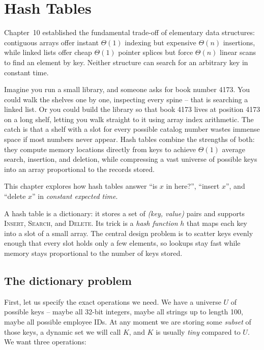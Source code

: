\chapter{Hash Tables}

Chapter~10 established the fundamental trade-off of elementary data structures:
contiguous arrays offer instant $\Theta(1)$ indexing but expensive $\Theta(n)$
insertions, while linked lists offer cheap $\Theta(1)$ pointer splices but force
$\Theta(n)$ linear scans to find an element by key. Neither structure can search
for an arbitrary key in constant time.

Imagine you run a small library, and someone asks for book number 4173. You could
walk the shelves one by one, inspecting every spine -- that is searching a linked
list. Or you could build the library so that book 4173 lives at position 4173 on a
long shelf, letting you walk straight to it using array index arithmetic. The
catch is that a shelf with a slot for every possible catalog number wastes immense
space if most numbers never appear. Hash tables combine the strengths of both:
they compute memory locations directly from keys to achieve $\Theta(1)$ average
search, insertion, and deletion, while compressing a vast universe of possible keys
into an array proportional to the records stored.

This chapter explores how hash tables answer ``is $x$ in here?'', ``insert $x$'', and ``delete $x$'' in \emph{constant expected time}.

\begin{focusbox}
A hash table is a dictionary: it stores a set of \emph{(key, value)} pairs and supports \textsc{Insert}, \textsc{Search}, and \textsc{Delete}. Its trick is a \emph{hash function} $h$ that maps each key into a slot of a small array. The central design problem is to scatter keys evenly enough that every slot holds only a few elements, so lookups stay fast while memory stays proportional to the number of keys stored.
\end{focusbox}

\section{The dictionary problem}

First, let us specify the exact operations we need. We have a universe $U$ of possible keys -- maybe all 32-bit integers, maybe all strings up to length 100, maybe all possible employee IDs. At any moment we are storing some \emph{subset} of those keys, a dynamic set we will call $K$, and $K$ is usually \emph{tiny} compared to $U$. We want three operations:

